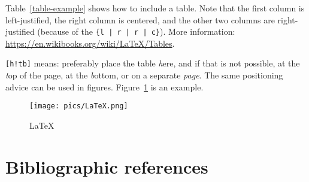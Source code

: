 Table~\ref{table-example} shows how to include a table. Note that the first column is left-justified, the right column is centered, and the other two columns are right-justified (because of the \texttt{\{l | r | r | c\}}). More information: \url{https://en.wikibooks.org/wiki/LaTeX/Tables}. 

\texttt{[h!tb]} means: preferably place the table \emph{h}ere, and if that is not possible, at the \emph{t}op of the page, at the \emph{b}ottom, or on a separate \emph{page}. The same positioning advice can be used in figures. Figure~\ref{fig-example} is an example.

\begin{figure}[h!tbp]
\texttt{[image: pics/LaTeX.png]}
\caption{LaTeX}
\label{fig-example}
\end{figure}



\section{Bibliographic references}




